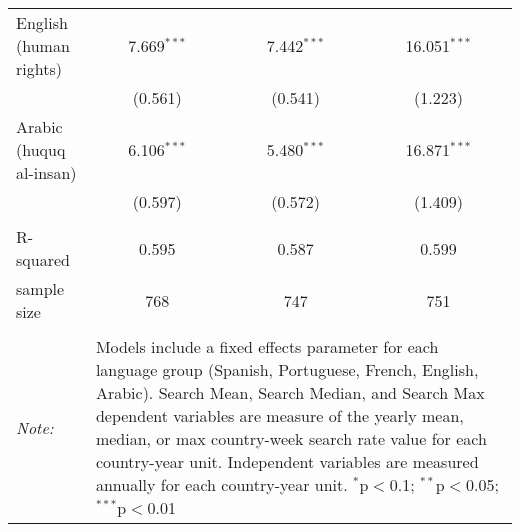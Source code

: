 \begin{table}[!htbp]
\begin{tabular}{@{\extracolsep{5pt}}lccc}
  English (human rights) & 7.669$^{***}$ & 7.442$^{***}$ & 16.051$^{***}$ \\ 
  & (0.561) & (0.541) & (1.223) \\ 
  Arabic (huquq al-insan) & 6.106$^{***}$ & 5.480$^{***}$ & 16.871$^{***}$ \\ 
  & (0.597) & (0.572) & (1.409) \\ 
 \hline \\[-1.8ex] 
R-squared  & 0.595 & 0.587 & 0.599 \\ 
sample size  & 768 & 747 & 751 \\ 
\hline 
\hline \\[-1.8ex] 
\textit{Note:}  & \multicolumn{3}{l}{\parbox[t]{8cm}{Models include a fixed effects parameter for each language group (Spanish, Portuguese, French, English, Arabic). Search Mean, Search Median, and Search Max dependent variables are measure of the yearly mean, median, or max country-week search rate value for each country-year unit. Independent variables are measured annually for each country-year unit. $^{*}$p$<$0.1; $^{**}$p$<$0.05; $^{***}$p$<$0.01}} \\ 
\end{tabular} 
\end{table} 
